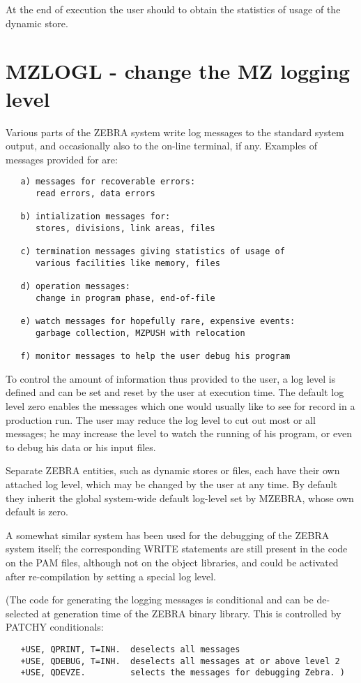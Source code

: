At the end of execution the user should
to obtain the statistics of usage of the dynamic store.

\section{MZLOGL - change the MZ logging level}

Various parts of the ZEBRA system write log messages
to the standard system output,
and occasionally also to the on-line terminal, if any.
Examples of messages provided for are:
\begin{verbatim}
   a) messages for recoverable errors:
      read errors, data errors

   b) intialization messages for:
      stores, divisions, link areas, files

   c) termination messages giving statistics of usage of
      various facilities like memory, files

   d) operation messages:
      change in program phase, end-of-file

   e) watch messages for hopefully rare, expensive events:
      garbage collection, MZPUSH with relocation

   f) monitor messages to help the user debug his program
\end{verbatim} 
To control the amount of information thus provided to the user,
a log level is defined and can be set and reset by the user
at execution time.
The default log level zero enables the messages which one would
usually like to see for record in a production run.
The user may reduce the log level to cut out most or all messages;
he may increase the level to watch the running of his program,
or even to debug his data or his input files.

Separate ZEBRA entities, such as dynamic stores or files,
each have their own attached log level,
which may be changed by the user at any time.
By default they inherit the global system-wide default log-level
set by MZEBRA, whose own default is zero.

A somewhat similar system has been used
for the debugging of the ZEBRA system itself;
the corresponding WRITE statements are still present in the code
on the PAM files, although not on the object libraries,
and could be activated after re-compilation
by setting a special log level.

(The code for generating the logging messages is conditional and can
be de-selected at generation time of the ZEBRA binary library.
This is controlled by PATCHY conditionals:
\begin{verbatim}
   +USE, QPRINT, T=INH.  deselects all messages
   +USE, QDEBUG, T=INH.  deselects all messages at or above level 2
   +USE, QDEVZE.         selects the messages for debugging Zebra. )
\end{verbatim} 

